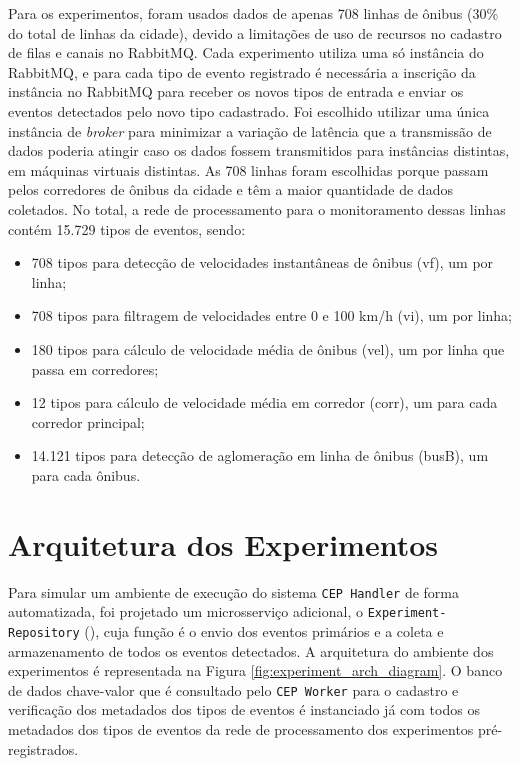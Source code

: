 Para os experimentos, foram usados dados de apenas 708 linhas de ônibus (30\% do total de linhas da cidade), devido a limitações de uso de recursos no cadastro de filas e canais no RabbitMQ. Cada experimento utiliza uma só instância do RabbitMQ, e para cada tipo de evento registrado é necessária a inscrição da instância no RabbitMQ para receber os novos tipos de entrada e enviar os eventos detectados pelo novo tipo cadastrado. Foi escolhido utilizar uma única instância de \textit{broker} para minimizar a variação de latência que a transmissão de dados poderia atingir caso os dados fossem transmitidos para instâncias distintas, em máquinas virtuais distintas. As 708 linhas foram escolhidas porque passam pelos corredores de ônibus da cidade e têm a maior quantidade de dados coletados. No total, a rede de processamento para o monitoramento dessas linhas contém 15.729 tipos de eventos, sendo:
\begin{itemize}
    \item 708 tipos para detecção de velocidades instantâneas de ônibus (vf), um por linha;
    \item 708 tipos para filtragem de velocidades entre 0 e 100 km/h (vi), um por linha;
    \item 180 tipos para cálculo de velocidade média de ônibus (vel), um por linha que passa em corredores;
    \item 12 tipos para cálculo de velocidade média em corredor (corr), um para cada corredor principal;
    \item 14.121 tipos para detecção de aglomeração em linha de ônibus (busB), um para cada ônibus.
\end{itemize}


\section{Arquitetura dos Experimentos}
\label{sec:experiment_architecture}
Para simular um ambiente de execução do sistema \texttt{CEP Handler} de forma automatizada, foi projetado um microsserviço adicional, o \texttt{Experiment-Repository} (\cite{Experiment-Repository}), cuja função é o envio dos eventos primários e a coleta e armazenamento de todos os eventos detectados. A arquitetura do ambiente dos experimentos é representada na Figura \ref{fig:experiment_arch_diagram}.
O banco de dados chave-valor que é consultado pelo \texttt{CEP Worker} para o cadastro e verificação dos metadados dos tipos de eventos é instanciado já com todos os metadados dos tipos de eventos da rede de processamento dos experimentos pré-registrados.

